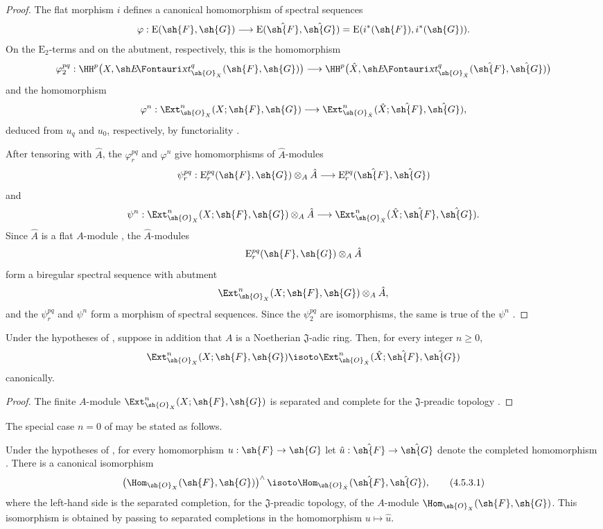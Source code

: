 \begin{proof}
The flat morphism $i$ defines a canonical homomorphism of spectral
sequences
\[
  \varphi:\mathrm{E}(\sh{F},\sh{G})
  \longrightarrow
  \mathrm{E}(\hat{\sh{F}},\hat{\sh{G}})
  =
  \mathrm{E}(i^*(\sh{F}),i^*(\sh{G})).
\]
On the $\mathrm{E}_2$-terms and on the abutment, respectively, this
is the homomorphism
\[
  \varphi_2^{pq}:
  \HH^p\bigl(X,\shExt^q_{\sh{O}_X}(\sh{F},\sh{G})\bigr)
  \longrightarrow
  \HH^p\bigl(\hat{X},
    \shExt^q_{\sh{O}_{\hat{X}}}
      (\hat{\sh{F}},\hat{\sh{G}})\bigr)
\]
and the homomorphism
\[
  \varphi^n:
  \Ext^n_{\sh{O}_X}(X;\sh{F},\sh{G})
  \longrightarrow
  \Ext^n_{\sh{O}_{\hat{X}}}
    (\hat{X};\hat{\sh{F}},\hat{\sh{G}}),
\]
deduced from $u_q$ and $u_0$, respectively, by functoriality
.

After tensoring with $\hat{A}$, the $\varphi_r^{pq}$ and
$\varphi^n$ give homomorphisms of $\hat{A}$-modules
\[
  \psi_r^{pq}:
  \mathrm{E}_r^{pq}(\sh{F},\sh{G})\otimes_A\hat{A}
  \longrightarrow
  \mathrm{E}_r^{pq}(\hat{\sh{F}},\hat{\sh{G}})
\]
and
\[
  \psi^n:
  \Ext^n_{\sh{O}_X}(X;\sh{F},\sh{G})\otimes_A\hat{A}
  \longrightarrow
  \Ext^n_{\sh{O}_{\hat{X}}}
    (\hat{X};\hat{\sh{F}},\hat{\sh{G}}).
\]
Since $\hat{A}$ is a flat $A$-module , the
$\hat{A}$-modules
\[
  \mathrm{E}_r^{pq}(\sh{F},\sh{G})\otimes_A\hat{A}
\]
form a biregular spectral sequence with abutment
\[
  \Ext^n_{\sh{O}_X}(X;\sh{F},\sh{G})\otimes_A\hat{A},
\]
and the $\psi_r^{pq}$ and $\psi^n$ form a morphism of spectral
sequences.  Since the $\psi_2^{pq}$ are isomorphisms, the same is true
of the $\psi^n$ .
\end{proof}

\begin{corollary}[4.5.2]
\label{III.4.5.2}
Under the hypotheses of , suppose in addition that
$A$ is a Noetherian $\mathfrak J$-adic ring.  Then, for every integer
$n\geq0$,
\[
  \Ext^n_{\sh{O}_X}(X;\sh{F},\sh{G})
  \isoto
  \Ext^n_{\sh{O}_{\hat{X}}}
    (\hat{X};\hat{\sh{F}},\hat{\sh{G}})
\]
canonically.
\end{corollary}

\begin{proof}
The finite $A$-module
$\Ext^n_{\sh{O}_X}(X;\sh{F},\sh{G})$ is separated and complete for
the $\mathfrak J$-preadic topology .
\end{proof}

The special case $n=0$ of  may be stated as follows.

\begin{corollary}[4.5.3]
\label{III.4.5.3}
Under the hypotheses of , for every homomorphism
$u:\sh{F}\to\sh{G}$ let $\hat{u}:\hat{\sh{F}}\to\hat{\sh{G}}$
denote the completed homomorphism .  There is a
canonical isomorphism
\[
\label{III.4.5.3.1}
  \left(\Hom_{\sh{O}_X}(\sh{F},\sh{G})\right)^\wedge
  \isoto
  \Hom_{\sh{O}_{\hat{X}}}(\hat{\sh{F}},\hat{\sh{G}}),
  \tag{4.5.3.1}
\]
where the left-hand side is the separated completion, for the
$\mathfrak J$-preadic topology, of the $A$-module
$\Hom_{\sh{O}_X}(\sh{F},\sh{G})$.  This isomorphism is obtained by
passing to separated completions in the homomorphism
$u\mapsto\hat{u}$.
\end{corollary}


